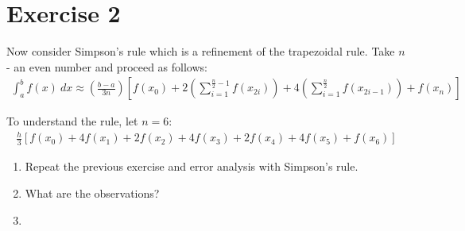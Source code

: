 \documentclass[10pt, a4paper]{article}
\begin{document}
\section{Exercise 2}

Now consider Simpson’s rule which is a refinement of the trapezoidal rule. Take $n$ - an even number and proceed as follows:
\begin{align*}
    \int_a^b f(x)\: dx \approx \left(\frac{b-a}{3n}\right)\left[f(x_0)+2\left(\sum_{i=1}^{\frac{n}{2}-1}f(x_{2i})\right)+4\left(\sum_{i=1}^{\frac{n}{2}}f(x_{2i-1})\right)+f(x_n)\right]
\end{align*}

To understand the rule, let $n=6$:
\begin{align*}
    \frac{h}{3}\left[f(x_0)+4f(x_1)+2f(x_2)+4f(x_3)+2f(x_4)+4f(x_5)+f(x_6)\right]
\end{align*}

\begin{enumerate}
    \item Repeat the previous exercise and error analysis with Simpson’s rule.
    \item What are the observations?
    \item 
\end{enumerate}
\end{document}
